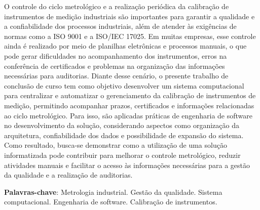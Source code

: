 \documentclass[
	12pt,       %
	oneside,    %
	a4paper,    %
	english,    %
	brazilian   %
]{abntex2}
\begin{document}
\setlength{\absparsep}{18pt} %
\begin{resumo}
O controle do ciclo metrológico e a realização periódica da calibração de instrumentos de medição industriais são importantes para garantir a qualidade e a confiabilidade dos processos industriais, além de atender às exigências de normas como a ISO 9001 e a ISO/IEC 17025. Em muitas empresas, esse controle ainda é realizado por meio de planilhas eletrônicas e processos manuais, o que pode gerar dificuldades no acompanhamento dos instrumentos, erros na conferência de certificados e problemas na organização das informações necessárias para auditorias. Diante desse cenário, o presente trabalho de conclusão de curso tem como objetivo desenvolver um sistema computacional para centralizar e automatizar o gerenciamento da calibração de instrumentos de medição, permitindo acompanhar prazos, certificados e informações relacionadas ao ciclo metrológico. Para isso, são aplicadas práticas de engenharia de software no desenvolvimento da solução, considerando aspectos como organização da arquitetura, confiabilidade dos dados e possibilidade de expansão do sistema. Como resultado, busca-se demonstrar como a utilização de uma solução informatizada pode contribuir para melhorar o controle metrológico, reduzir atividades manuais e facilitar o acesso às informações necessárias para a gestão da qualidade e a realização de auditorias.

\textbf{Palavras-chave}: Metrologia industrial. Gestão da qualidade. Sistema computacional. Engenharia de software. Calibração de instrumentos.
\end{resumo}
\end{document}
